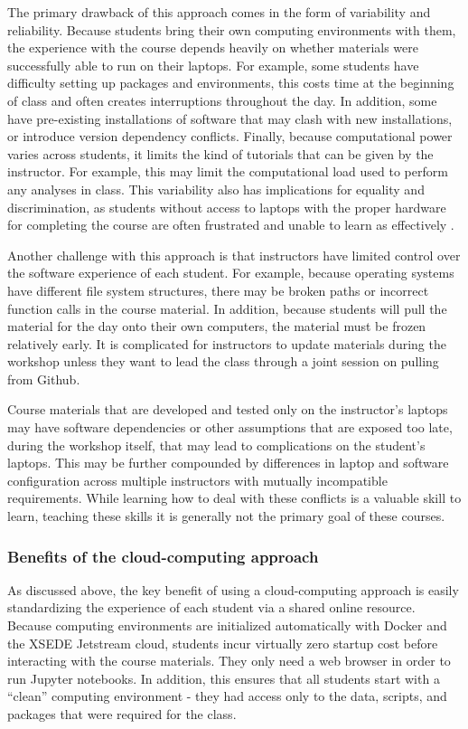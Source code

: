 The primary drawback of this approach comes in the form of variability and
reliability. Because students bring their own computing environments with them,
the experience with the course depends heavily on whether materials were
successfully able to run on their laptops. For example, some students have
difficulty setting up packages and environments, this costs time at the
beginning of class and often creates interruptions throughout the day. In
addition, some have pre-existing installations of software that may clash with
new installations, or introduce version dependency conflicts. Finally, because
computational power varies across students, it limits the kind of tutorials that
can be given by the instructor. For example, this may limit the computational
load used to perform any analyses in class. This variability also has
implications for equality and discrimination, as students without access to
laptops with the proper hardware for completing the course are often frustrated
and unable to learn as effectively \cite{clark-proc-scipy-2014}.

Another challenge with this approach is that instructors have limited control
over the software experience of each student. For example, because operating
systems have different file system structures, there may be broken paths or
incorrect function calls in the course material. In addition, because students
will pull the material for the day onto their own computers, the material must
be frozen relatively early. It is complicated for instructors to update
materials during the workshop unless they want to lead the class through a joint
session on pulling from Github.

Course materials that are developed and tested only on the instructor's laptops
may have software dependencies or other assumptions that are exposed too late,
during the workshop itself, that may lead to complications on the student's
laptops. This may be further compounded by differences in laptop and software
configuration across multiple instructors with mutually incompatible
requirements. While learning how to deal with these conflicts is a valuable
skill to learn, teaching these skills it is generally not the primary goal of
these courses.

\subsubsection{Benefits of the cloud-computing approach}

As discussed above, the key benefit of using a cloud-computing approach is
easily standardizing the experience of each student via a shared online
resource. Because computing environments are initialized automatically with
Docker and the XSEDE Jetstream cloud, students incur virtually zero startup cost
before interacting with the course materials. They only need a web browser in
order to run Jupyter notebooks. In addition, this ensures that all students
start with a ``clean'' computing environment - they had access only to the data,
scripts, and packages that were required for the class.


